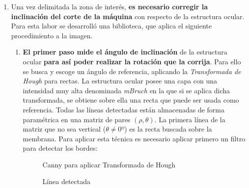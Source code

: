 \begin{enumerate}
\begin{enumerate}[label*=\arabic*.]
\begin{enumerate}[label*=\arabic*.]
    \end{enumerate}
  \end{enumerate}
\item Una vez delimitada la zona de interés, \textbf{es necesario
    corregir la inclinación del corte de la máquina} con respecto de
  la estructura ocular. \\
  Para esta labor se desarrolló una biblioteca, que aplica el
  siguiente procedimiento a la imagen.
  \begin{enumerate}[label*=\arabic*.]
  \item \textbf{El primer paso mide el ángulo de inclinación} de la
    estructura ocular \textbf{para así poder realizar la rotación que
      la corrija}.  Para ello se busca y escoge un ángulo de
    referencia, aplicando la \emph{Transformada de
      Hough} para rectas. La estructura
    ocular posee una capa con una intensidad muy alta denominada
    \emph{\gls{mBruch}} en la que si se aplica dicha transformada, se
    obtiene sobre ella una recta que puede ser usada como
    referencia. Todas las líneas detectadas están almacenadas de forma
    paramétrica en una matriz de pares $\left(\rho, \theta \right)$.
    La primera línea de la matriz que no sea vertical
    ($\theta \neq 0º$) es la recta buscada sobre la membrana. Para aplicar
    esta técnica es necesario aplicar primero un filtro para detectar
    los bordes:

      \begin{figure}[H]
        \caption{Canny para aplicar Transformada de Hough}
        \centering \setlength\fboxsep{0pt} \setlength\fboxrule{0.5pt}
      \end{figure}

      \begin{figure}[H]
        \caption{Línea detectada}
        \centering \setlength\fboxsep{0pt} \setlength\fboxrule{0.5pt}
      \end{figure}



\end{enumerate}
\end{enumerate}
